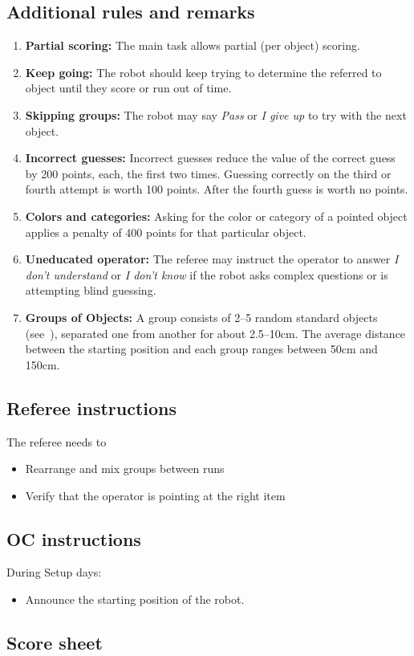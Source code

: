 \subsection*{Additional rules and remarks}
\begin{enumerate}[nosep]
	\item \textbf{Partial scoring:} The main task allows partial (per object) scoring.
	
	\item \textbf{Keep going:} The robot should keep trying to determine the referred to object until they score or run out of time.

	\item \textbf{Skipping groups:} The robot may say \emph{Pass} or \emph{I give up} to try with the next object.

	\item \textbf{Incorrect guesses:} Incorrect guesses reduce the value of the correct guess by 200 points, each, the first two times. Guessing correctly on the third or fourth attempt is worth 100 points. After the fourth guess is worth no points.

	\item\textbf{Colors and categories:} Asking for the color or category of a pointed object applies a penalty of 400 points for that particular object.

	\item\textbf{Uneducated operator:} The referee may instruct the operator to answer \emph{I don't understand} or \emph{I don't know} if the robot asks complex questions or is attempting blind guessing.

	\item \textbf{Groups of Objects:} A group consists of 2--5 random standard objects (see~), separated one from another for about 2.5--10cm.
	The average distance between the starting position and each group ranges between 50cm and 150cm.

\end{enumerate}
\enlargethispage{\baselineskip} %

\subsection*{Referee instructions}

The referee needs to
\begin{itemize}[nosep]
	\item Rearrange and mix groups between runs
	\item Verify that the operator is pointing at the right item
\end{itemize}

\subsection*{OC instructions}
During Setup days:
\begin{itemize}[nosep]
	\item Announce the starting position of the robot.
\end{itemize}


\subsection*{Score sheet}


